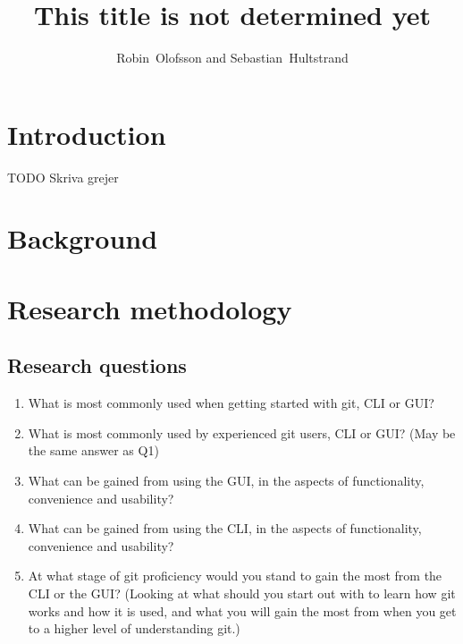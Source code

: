 \documentclass[12pt,a4paper,article,compsoc]{IEEEtran}
\begin{document}
	\title{This title is not determined yet}
	\author{Robin~Olofsson and Sebastian~Hultstrand}
	
		
		\maketitle
		
		\section{Introduction}
		TODO Skriva grejer
		
		\section{Background}
		
		\section{Research methodology}
			\subsection{Research questions}
			\begin{enumerate}
				\item What is most commonly used when getting started with git, CLI or GUI?
				\item What is most commonly used by experienced git users, CLI or GUI? (May be the same answer as Q1)
				\item What can be gained from using the GUI, in the aspects of functionality, convenience and usability?
				\item What can be gained from using the CLI, in the aspects of functionality, convenience and usability?
				\item At what stage of git proficiency would you stand to gain the most from the CLI or the GUI? (Looking at what should you start out with to learn how git works and how it is used, and what you will gain the most from when you get to a higher level of understanding git.)
			\end{enumerate}
		
\end{document}
